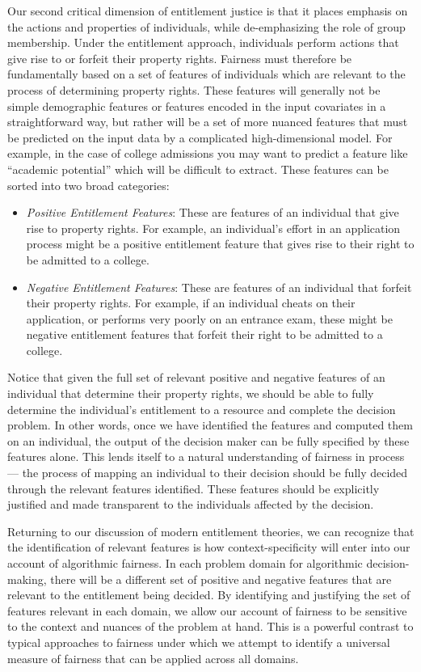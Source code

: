 Our second critical dimension of entitlement justice is that it places
emphasis on the actions and properties of individuals, while de-emphasizing
the role of group membership. Under the entitlement approach, individuals
perform actions that give rise to or forfeit their property rights. Fairness
must therefore be fundamentally based on a set of features of individuals which
are relevant to the process of determining property rights. These features will
generally not be simple demographic features or features encoded in the input
covariates in a straightforward way, but rather will be a set of more nuanced
features that must be predicted on the input data by a complicated
high-dimensional model. For example, in the case of college admissions you may
want to predict a feature like ``academic potential'' which will be difficult to
extract. These features can be sorted into two broad categories:
\begin{itemize}
    \item \emph{Positive Entitlement Features}: These are features of an
    individual that give rise to property rights. For example, an
    individual's effort in an application process might be a positive
    entitlement feature that gives rise to their right to be admitted
    to a college.
    \item \emph{Negative Entitlement Features}: These are features of an
    individual that forfeit their property rights. For example, if
    an individual cheats on their application, or performs very poorly on an
    entrance exam, these might be negative entitlement features that
    forfeit their right to be admitted to a college. 
\end{itemize}
Notice that given the full set of relevant positive and negative features of an
individual that determine their property rights, we should be able to fully
determine the individual's entitlement to a resource and complete the decision
problem. In other words, once we have identified the features and computed
them on an individual, the output of the decision maker can be fully specified
by these features alone. This lends itself to a natural understanding of
fairness in process — the process of mapping an individual to their decision
should be fully decided through the relevant features identified. These
features should be explicitly justified and made transparent to the
individuals affected by the decision. 

Returning to our discussion of modern entitlement theories, we can recognize
that the identification of relevant features is how context-specificity will
enter into our account of algorithmic fairness. In each problem domain for 
algorithmic decision-making, there will be a different set of positive and
negative features that are relevant to the entitlement being decided. By
identifying and justifying the set of features relevant in each domain, we
allow our account of fairness to be sensitive to the context and nuances of the
problem at hand. This is a powerful contrast to typical approaches to fairness
under which we attempt to identify a universal measure of fairness that can be
applied across all domains.

